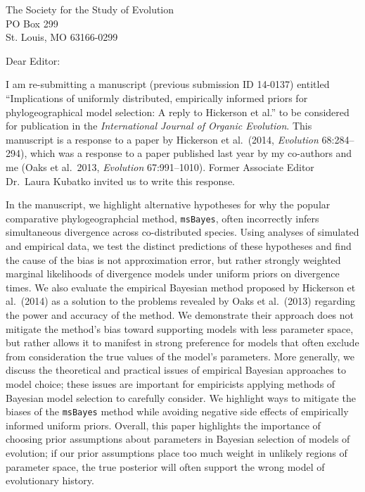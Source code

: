 \documentclass[letterpaper]{letter}
\begin{document}
\begin{letter}{The Society for the Study of Evolution \\
                     PO Box 299 \\
                     St. Louis, MO 63166-0299}
\opening{Dear Editor:}
I am re-submitting a manuscript (previous submission ID 14-0137) entitled
``Implications of uniformly distributed, empirically informed priors for
phylogeographical model selection:
A reply to Hickerson et al.'' to be considered for publication in the
\emph{International Journal of Organic Evolution}.
This manuscript is a response to a paper by Hickerson et al.\ (2014,
\emph{Evolution} 68:284--294), which was a response to a paper published last
year by my co-authors and me (Oaks et al.\ 2013, \emph{Evolution}
67:991--1010).
Former Associate Editor Dr.\ Laura Kubatko invited us to write this response.

In the manuscript, we highlight alternative hypotheses for why the popular
comparative phylogeographcial method, \texttt{msBayes}, often incorrectly
infers simultaneous divergence across co-distributed species.
Using analyses of simulated and empirical data, we test the distinct
predictions of these hypotheses and find the cause of the bias is not
approximation error, but rather strongly weighted marginal likelihoods of
divergence models under uniform priors on divergence times.
We also evaluate the empirical Bayesian method proposed by Hickerson et al.\
(2014) as a solution to the problems revealed by Oaks et al.\ (2013) regarding
the power and accuracy of the method.
We demonstrate their approach does not mitigate the method's bias toward
supporting models with less parameter space, but rather allows it to manifest
in strong preference for models that often exclude from consideration the true
values of the model's parameters.
More generally, we discuss the theoretical and practical issues of empirical
Bayesian approaches to model choice; these issues are important for empiricists
applying methods of Bayesian model selection to carefully consider.
We highlight ways to mitigate the biases of the \texttt{msBayes} method while
avoiding negative side effects of empirically informed uniform priors.
Overall, this paper highlights the importance of choosing prior assumptions
about parameters in Bayesian selection of models of evolution; if our prior
assumptions place too much weight in unlikely regions of parameter space, the
true posterior will often support the wrong model of evolutionary history.


\end{letter}
\end{document}
